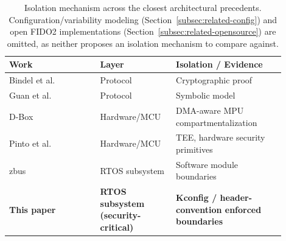 \begin{table}[t]
\centering
\caption{Isolation mechanism across the closest architectural precedents. Configuration/variability modeling (Section~\ref{subsec:related-config}) and open FIDO2 implementations (Section~\ref{subsec:related-opensource}) are omitted, as neither proposes an isolation mechanism to compare against.}
\label{tab:related-positioning}
\small
\begin{tabular}{@{}p{0.30\linewidth} p{0.24\linewidth} p{0.36\linewidth}@{}}
\toprule
\textbf{Work} & \textbf{Layer} & \textbf{Isolation / Evidence} \\
\midrule
Bindel et al.~\cite{bindel2023fido2}      & Protocol           & Cryptographic proof \\
Guan et al.~\cite{guan2022formal}         & Protocol           & Symbolic model \\
D-Box~\cite{mera2022dbox}                 & Hardware/MCU       & DMA-aware MPU compartmentalization \\
Pinto et al.~\cite{tee2024interop}        & Hardware/MCU       & TEE, hardware security primitives \\
zbus~\cite{peixoto2024zbus}               & RTOS subsystem     & Software module boundaries \\
\textbf{This paper}                       & \textbf{RTOS subsystem (security-critical)} & \textbf{Kconfig / header-convention enforced boundaries} \\
\bottomrule
\end{tabular}
\end{table}